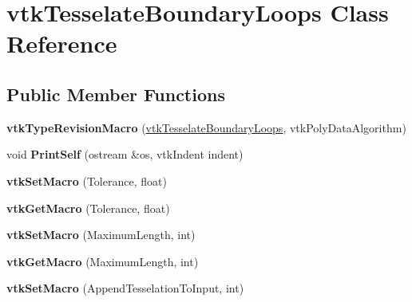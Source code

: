 \hypertarget{classvtkTesselateBoundaryLoops}{
\section{vtkTesselateBoundaryLoops Class Reference}
\label{classvtkTesselateBoundaryLoops}
}
\subsection*{Public Member Functions}
\begin{DoxyCompactItemize}
\item 
\hypertarget{classvtkTesselateBoundaryLoops_a08c05aa06778a5102bda9d129c2f4a10}{
{\bfseries vtkTypeRevisionMacro} (\hyperlink{classvtkTesselateBoundaryLoops}{vtkTesselateBoundaryLoops}, vtkPolyDataAlgorithm)}
\label{classvtkTesselateBoundaryLoops_a08c05aa06778a5102bda9d129c2f4a10}

\item 
\hypertarget{classvtkTesselateBoundaryLoops_ad41350a4c60c99c97108f5dd3ef28445}{
void {\bfseries PrintSelf} (ostream \&os, vtkIndent indent)}
\label{classvtkTesselateBoundaryLoops_ad41350a4c60c99c97108f5dd3ef28445}

\item 
\hypertarget{classvtkTesselateBoundaryLoops_ae18b4dc7724aca84f23ba2603c03b08b}{
{\bfseries vtkSetMacro} (Tolerance, float)}
\label{classvtkTesselateBoundaryLoops_ae18b4dc7724aca84f23ba2603c03b08b}

\item 
\hypertarget{classvtkTesselateBoundaryLoops_aea06d1e44aaf06b0ae7d7a990eef0b6c}{
{\bfseries vtkGetMacro} (Tolerance, float)}
\label{classvtkTesselateBoundaryLoops_aea06d1e44aaf06b0ae7d7a990eef0b6c}

\item 
\hypertarget{classvtkTesselateBoundaryLoops_aad5dc9c29cb0206975e44814ba1dec78}{
{\bfseries vtkSetMacro} (MaximumLength, int)}
\label{classvtkTesselateBoundaryLoops_aad5dc9c29cb0206975e44814ba1dec78}

\item 
\hypertarget{classvtkTesselateBoundaryLoops_a7be2453459ef4af97745a108d76b1474}{
{\bfseries vtkGetMacro} (MaximumLength, int)}
\label{classvtkTesselateBoundaryLoops_a7be2453459ef4af97745a108d76b1474}

\item 
\hypertarget{classvtkTesselateBoundaryLoops_a1e97486fbb4af3db59606c0f98b15678}{
{\bfseries vtkSetMacro} (AppendTesselationToInput, int)}
\label{classvtkTesselateBoundaryLoops_a1e97486fbb4af3db59606c0f98b15678}


\end{DoxyCompactItemize}
